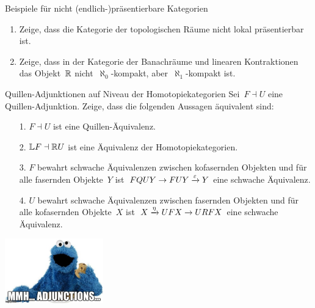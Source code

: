 \documentclass{uebblatt}
\begin{document}
\begin{aufgabe}{Beispiele für nicht (endlich-)präsentierbare Kategorien}
\begin{enumerate}
\item Zeige, dass die Kategorie der topologischen Räume nicht lokal präsentierbar
ist.
\item Zeige, dass in der Kategorie der Banachräume und linearen Kontraktionen
das Objekt~$\mathbb{R}$ nicht~$\aleph_0$-kompakt, aber~$\aleph_1$-kompakt ist.
\end{enumerate}
\end{aufgabe}

\begin{aufgabe}{Quillen-Adjunktionen auf Niveau der Homotopiekategorien}
Sei~$F \dashv U$ eine Quillen-Adjunktion. Zeige, dass
die folgenden Aussagen äquivalent sind:
\begin{itemize}
\item[1.] $F \dashv U$ ist eine Quillen-Äquivalenz.
\item[2.] $\mathbb{L} F \dashv \mathbb{R} U$ ist eine Äquivalenz der Homotopiekategorien.
\item[3.] $F$ bewahrt schwache Äquivalenzen zwischen kofasernden Objekten und
für alle fasernden Objekte~$Y$ ist~$FQUY \to FUY \xrightarrow{\varepsilon} Y$ eine schwache
Äquivalenz.
\item[4.] $U$ bewahrt schwache Äquivalenzen zwischen fasernden Objekten und
für alle kofasernden Objekte~$X$ ist~$X \xrightarrow{\eta} UFX \to URFX$ eine schwache
Äquivalenz.
\end{itemize}
\end{aufgabe}
\enlargethispage{1.2cm}

\centering
\includegraphics[height=2.8cm]{images/mmh-adjunctions-cookie-monster}
\par
\end{document}

